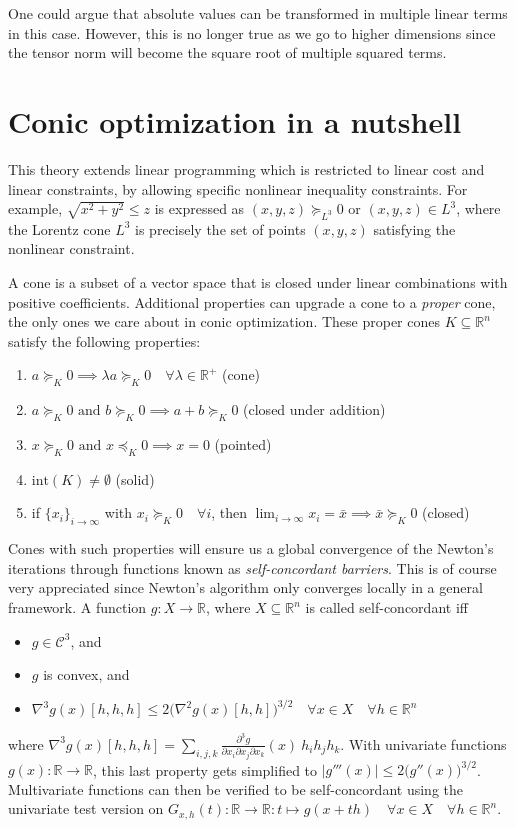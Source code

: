 \documentclass[11 pt]{report}
\begin{document}
One could argue that absolute values can be transformed in multiple linear terms in this case. However, this is no longer true as we go to higher dimensions since the tensor norm will become the square root of multiple squared terms. 

\section{Conic optimization in a nutshell}
This theory extends linear programming which is restricted to linear cost and linear constraints, by allowing specific nonlinear inequality constraints. For example, $\sqrt{x^2+y^2} \leq z$ is expressed as $(x,y,z) \succeq_{L^3} 0$ or $(x,y,z) \in L^3$, where the Lorentz cone $L^3$ is precisely the set of points $(x,y,z)$ satisfying the nonlinear constraint.

A cone is a subset of a vector space that is closed under linear combinations with positive coefficients. Additional properties can upgrade a cone to a \textit{proper} cone, the only ones we care about in conic optimization. These proper cones $K\subseteq \mathbb{R}^n$ satisfy the following properties:
\begin{enumerate}
    \item $a \succeq_K 0 \implies \lambda a \succeq_K 0 \quad \forall \lambda \in \mathbb{R}^+$ (cone)
    \item $a \succeq_K 0 \text{ and } b \succeq_K 0 \implies a + b \succeq_K 0$ (closed under addition)
    \item $x \succeq_K 0 \text{ and } x \preceq_K 0 \implies x = 0$ (pointed)
    \item $\textrm{int}(K) \neq \emptyset$ (solid)
    \item if $\{x_i\}_{i\to\infty}$ with $x_i \succeq_K 0 \quad \forall i$, then $\lim_{i\to\infty} x_i = \bar x \implies \bar x \succeq_K 0$ (closed)
\end{enumerate}

Cones with such properties will ensure us a global convergence of the Newton's iterations through functions known as \textit{self-concordant barriers}. This is of course very appreciated since Newton's algorithm only converges locally in a general framework.
A function $g:X\to\mathbb{R}$, where $X\subseteq \mathbb{R}^n$ is called self-concordant iff
\begin{itemize}[label=--]
    \item $g \in \mathcal{C}^3$, and
    \item $g$ is convex, and
    \item $\nabla^3 g(x) [h, h, h] \leq 2 \big(\nabla^2 g(x) [h, h]\big)^{3/2} \quad \forall x \in X \quad \forall h \in \mathbb{R}^n$
\end{itemize}
where $\nabla^3 g(x) [h, h, h] = \sum_{i, j, k} \frac{\partial^3 g}{\partial x_i \partial x_j \partial x_k}(x)\: h_i h_j h_k$. With univariate functions $g(x) : \mathbb{R} \to \mathbb{R}$, this last property gets simplified to $|g'''(x)| \leq 2 \big( g''(x) \big)^{3/2}$. Multivariate functions can then be verified to be self-concordant using the univariate test version on $G_{x,h}(t) : \mathbb{R} \to \mathbb{R} : t \mapsto g(x + th) \quad \forall x \in X \quad \forall h \in \mathbb{R}^n$.
\end{document}
